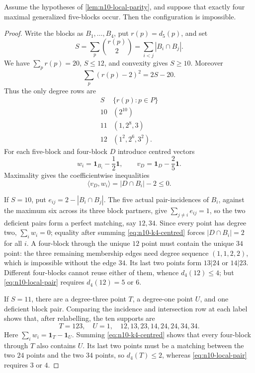 \begin{lemma}\label{lem:n10-four-pentagon}
Assume the hypotheses of \cref{lem:n10-local-parity}, and suppose that
exactly four maximal generalized five-blocks occur.  Then the configuration
is impossible.
\end{lemma}

\begin{proof}
Write the blocks as $B_1,\ldots,B_4$, put $r(p)=d_5(p)$, and set
\[
 S=\sum_p\binom{r(p)}2
   =\sum_{i<j}|B_i\cap B_j|.
\]
We have $\sum_pr(p)=20$, $S\le12$, and convexity gives $S\ge10$.
Moreover
\begin{equation}\label{eq:n10-k4-square}
 \sum_p(r(p)-2)^2=2S-20.
\end{equation}
Thus the only degree rows are
\begin{equation}\label{eq:n10-k4-degree-rows}
 \begin{array}{c|c}
 S&\{r(p):p\in P\}\\ \hline
 10&(2^{10})\\
 11&(1,2^8,3)\\
 12&(1^2,2^6,3^2).
 \end{array}
\end{equation}
For each five-block and four-block $D$ introduce centred vectors
\[
 w_i=\mathbf1_{B_i}-\frac12\mathbf1,
 \qquad v_D=\mathbf1_D-\frac25\mathbf1.
\]
Maximality gives the coefficientwise inequalities
\begin{equation}\label{eq:n10-k4-centred}
 \langle v_D,w_i\rangle=|D\cap B_i|-2\le0.
\end{equation}

If $S=10$, put $e_{ij}=2-|B_i\cap B_j|$.  The five actual
pair-incidences of $B_i$, against the maximum six across its three block
partners, give $\sum_{j\ne i}e_{ij}=1$, so the two
deficient pairs form a perfect matching, say $12,34$.  Since every point
has degree two, $\sum_iw_i=0$; equality after summing
\eqref{eq:n10-k4-centred} forces $|D\cap B_i|=2$ for all $i$.  A four-block
through the unique $12$ point must contain the unique $34$ point: the three
remaining membership edges need degree sequence $(1,1,2,2)$, which is
impossible without the edge $34$.  Its last two points form $13|24$ or
$14|23$.  Different four-blocks cannot reuse either of them, whence
$d_4(12)\le4$; but \eqref{eq:n10-local-pair} requires $d_4(12)=5$ or $6$.

If $S=11$, there are a degree-three point $T$, a degree-one point $U$, and
one deficient block pair.  Comparing the incidence and intersection row at
each label shows that, after relabelling, the ten supports are
\begin{equation}\label{eq:n10-k4-S11-supports}
 T=123,\quad U=1,\quad 12,13,23,14,24,24,34,34.
\end{equation}
Here $\sum_iw_i=\mathbf1_T-\mathbf1_U$.  Summing
\eqref{eq:n10-k4-centred} shows that every four-block through $T$ also
contains $U$.  Its last two points must be a matching between the two
$24$ points and the two $34$ points, so $d_4(T)\le2$, whereas
\eqref{eq:n10-local-pair} requires $3$ or $4$.


\end{proof}
